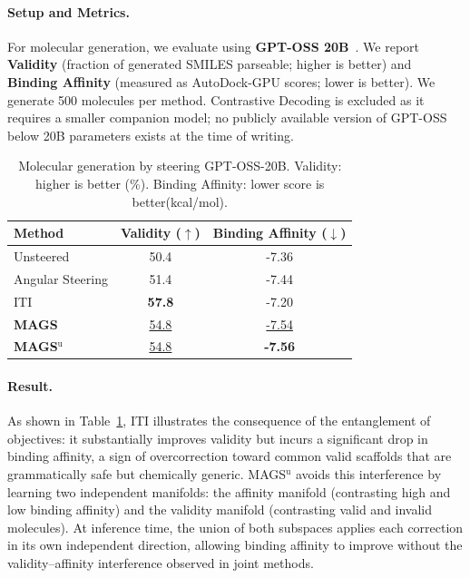 \documentclass{article}
\newcommand{\ours}{MAGS}
\begin{document}
\paragraph{Setup and Metrics.}
For molecular generation, we evaluate using \textbf{GPT-OSS 20B}~\cite{openai2025gptoss}. We report \textbf{Validity} (fraction of generated SMILES parseable; higher is better) and \textbf{Binding Affinity} (measured as AutoDock-GPU scores; lower is better). We generate 500 molecules per method. Contrastive Decoding is excluded as it requires a smaller companion model; no publicly available version of GPT-OSS below 20B parameters exists at the time of writing.

\begin{table}[h]
\centering
\caption{Molecular generation by steering GPT-OSS-20B.
  Validity: higher is better (\%).
  Binding Affinity: lower score is better(kcal/mol).}
\label{tab:molgen}
\begin{tabular}{lcc}
\toprule
\textbf{Method} & \textbf{Validity ($\uparrow$)} & \textbf{Binding Affinity ($\downarrow$)} \\
\midrule
Unsteered                          & 50.4 & -7.36 \\
Angular Steering & 51.4 & -7.44 \\
ITI         & \textbf{57.8} & -7.20 \\
\textbf{\ours{} }               & \underline{54.8} & \underline{-7.54} \\
\textbf{MAGS$^\text{u}$}               & \underline{54.8} & \textbf{-7.56} \\


\bottomrule
\end{tabular}
\end{table}
\paragraph{Result.} As shown in Table~\ref{tab:molgen}, ITI illustrates the consequence of the entanglement of objectives: it substantially improves validity but incurs a significant drop in binding affinity, a sign of overcorrection toward common valid scaffolds that are grammatically safe but chemically generic. MAGS$^{\text{u}}$ avoids this interference by learning two independent manifolds: the affinity manifold (contrasting high and low binding affinity) and the validity manifold (contrasting valid and invalid molecules). At inference time, the union of both subspaces applies each correction in its own independent direction, allowing binding affinity to improve without the validity–affinity interference observed in joint methods.
\end{document}
